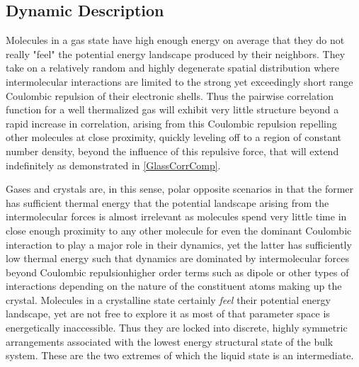 \subsection{Dynamic Description}

Molecules in a gas state have high enough energy on average that they do not really "feel" the potential energy landscape produced by their neighbors.  They take on a relatively random and highly degenerate spatial distribution where intermolecular interactions are limited to the strong yet exceedingly short range Coulombic repulsion of their electronic shells.  Thus the pairwise correlation function for a well thermalized gas will exhibit very little structure beyond a rapid increase in correlation, arising from this Coulombic repulsion repelling other molecules at close proximity, quickly leveling off to a region of constant number density, beyond the influence of this repulsive force, that will extend indefinitely as demonstrated in \fig \nolinebreak \ref{GlassCorrComp}.

Gases and crystals are, in this sense, polar opposite scenarios in that the former has sufficient thermal energy that the potential landscape arising from the intermolecular forces is almost irrelevant as molecules spend very little time in close enough proximity to any other molecule for even the dominant Coulombic interaction to play a major role in their dynamics, yet the latter has sufficiently low thermal energy such that dynamics are dominated by intermolecular forces beyond Coulombic repulsion\textemdash higher order terms such as dipole or other types of interactions depending on the nature of the constituent atoms making up the crystal.  Molecules in a crystalline state certainly \textit{feel} their potential energy landscape, yet are not free to explore it as most of that parameter space is energetically inaccessible. Thus they are locked into discrete, highly symmetric arrangements associated with the lowest energy structural state of the bulk system. These are the two extremes of which the liquid state is an intermediate.  

